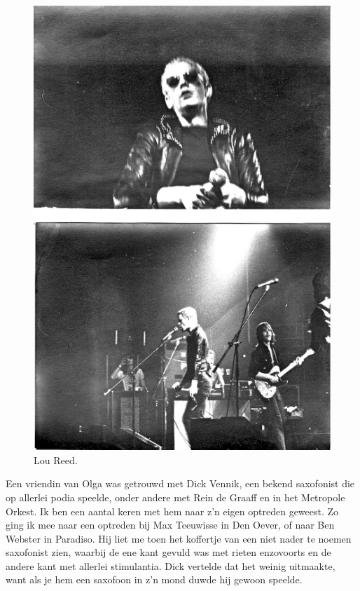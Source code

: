 \documentclass[12pt,twoside, openright]{memoir}
\begin{document}
\begin{figure}
\centering
\includegraphics[width=\textwidth]{img/ch31/reed}
\caption*{\footnotesize Lou Reed.}
\end{figure}

Een vriendin van Olga was getrouwd met Dick Vennik, een bekend saxofonist die op allerlei podia speelde, onder andere met Rein de Graaff en in het Metropole Orkest. Ik ben een aantal keren met hem naar z’n eigen optreden geweest. Zo ging ik mee naar een optreden bij Max Teeuwisse in Den Oever, of naar Ben Webster in Paradiso. Hij liet me toen het koffertje van een niet nader te noemen saxofonist zien, waarbij de ene kant gevuld was met rieten enzovoorts en de andere kant met allerlei stimulantia. Dick vertelde dat het weinig uitmaakte, want als je hem een saxofoon in z’n mond duwde hij gewoon speelde.
\end{document}

